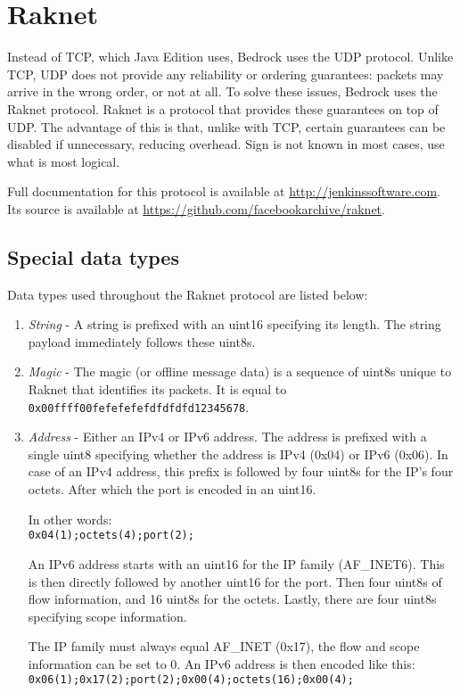 \chapter{Raknet}\label{chap:raknet}

Instead of TCP, which Java Edition uses, Bedrock uses the UDP protocol.
Unlike TCP, UDP does not provide any reliability or ordering guarantees:
packets may arrive in the wrong order, or not at all. 
To solve these issues, Bedrock uses the Raknet protocol. 
Raknet is a protocol that provides these guarantees on top of UDP.
The advantage of this is that, unlike with TCP, certain guarantees can be disabled if unnecessary,
reducing overhead. Sign is not known in most cases, use what is most logical.

Full documentation for this protocol is available at \url{http://jenkinssoftware.com}.
Its source is available at \url{https://github.com/facebookarchive/raknet}.

\section{Special data types}\label{sec:raknet-types}

Data types used throughout the Raknet protocol are listed below:
\begin{enumerate}
    \item \textit{String} - A string is prefixed with an uint16 specifying its length.
    The string payload immediately follows these uint8s.

    \item \textit{Magic} - The magic (or offline message data) is a sequence of uint8s unique to Raknet that identifies its packets.
    It is equal to \\
    \texttt{0x00ffff00fefefefefdfdfdfd12345678}.

    \item \textit{Address} - Either an IPv4 or IPv6 address.
        The address is prefixed with a single uint8 specifying whether the address is IPv4 (0x04) or IPv6 (0x06).
        In case of an IPv4 address, this prefix is followed by four uint8s for the IP's four octets.
        After which the port is encoded in an uint16. 

        In other words: \\
        \texttt{0x04(1);octets(4);port(2);}

        An IPv6 address starts with an uint16 for the IP family (AF\_INET6). 
        This is then directly followed by another uint16 for the port. 
        Then four uint8s of flow information, and 16 uint8s for the octets.
        Lastly, there are four uint8s specifying scope information.

        The IP family must always equal AF\_INET (0x17), the flow and scope information can be set to 0.
        An IPv6 address is then encoded like this:\\
        \texttt{0x06(1);0x17(2);port(2);0x00(4);octets(16);0x00(4);}
\end{enumerate}

